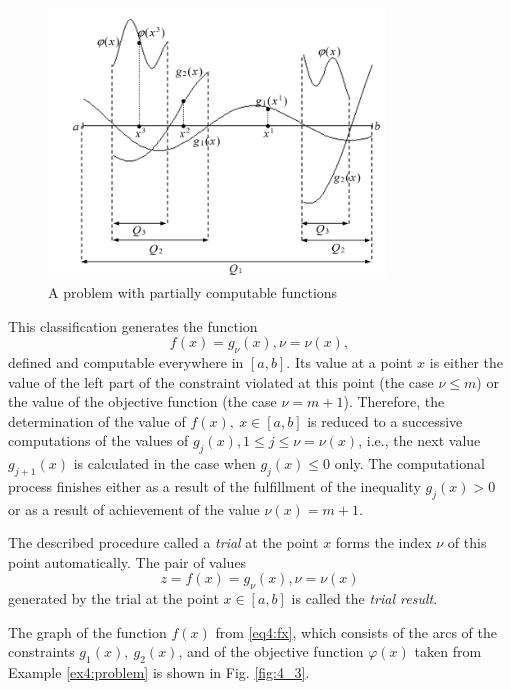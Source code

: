 \begin{figure}[ht]
  \centering
  \includegraphics[width=0.8\textwidth]{figures/4_2.png}
  \caption{A problem with partially computable functions}
  \label{fig:4_2}
\end{figure}

This classification generates the function
\begin{equation}
  \label{eq4:fx}
  f(x)=g_\nu(x),\nu=\nu(x),
\end{equation}
defined and computable everywhere in $[a,b]$. Its value at a point $x$ is either the value of the left part of the constraint violated at this point (the case $\nu\le m$)  or the value of the objective function (the case $\nu=m+1$). Therefore, the determination of the value of $f(x),\:x\in[a,b]$  is reduced to a successive computations of the values of $g_j(x), 1\le j\le \nu=\nu(x)$, i.e., the next value $g_{j+1}(x)$ is calculated in the case when $g_j(x)\le 0$ only. The computational process finishes either as a result of the fulfillment of the inequality $g_j(x)>0$ or as a result of achievement of the value $\nu(x)=m+1$.

The described procedure called a \emph{trial} at the point $x$ forms the index $\nu$ of this point automatically. The pair of values
\begin{equation}
  \label{eq4:trial}
  z=f(x)=g_\nu(x),\nu=\nu(x)
\end{equation}
generated by the trial at the point $x\in[a,b]$ is called the \emph{trial result}.

The graph of the function $f(x)$ from \eqref{eq4:fx}, which consists of the arcs of the constraints $g_1(x),\:g_2(x)$, and of the objective function $\varphi(x)$ taken from Example \ref{ex4:problem} is shown in Fig. \ref{fig:4_3}.

